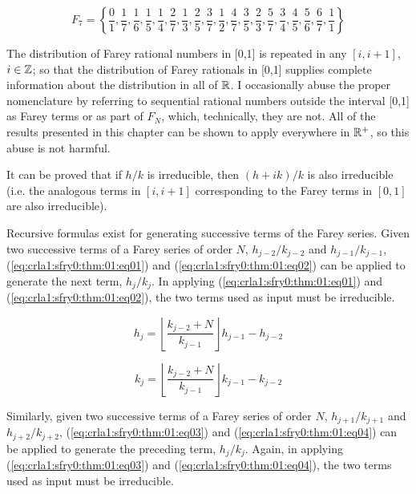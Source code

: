 \begin{equation}
\label{eq:crla1:sfry0:eq0001g}
F_7  = \left\{ {\frac{0}{1},\frac{1}{7},\frac{1}{6},\frac{1}{5},
                \frac{1}{4},\frac{2}{7},
                \frac{1}{3},\frac{2}{5},\frac{3}{7},\frac{1}{2},
                \frac{4}{7},\frac{3}{5},\frac{2}{3},
                \frac{5}{7},\frac{3}{4},
                \frac{4}{5},
                \frac{5}{6},\frac{6}{7},\frac{1}{1} } \right\}
\end{equation}

The distribution of Farey rational numbers in [0,1] is repeated in any
$[i,i+1]$, $i\in {\mathbb{Z}}$; so that the distribution of Farey
rationals in [0,1] supplies complete information about the distribution in
all of ${\mathbb{R}}$\@.  I occasionally abuse the proper nomenclature by
referring to sequential rational numbers outside the interval [0,1] as
Farey terms or as part of $F_N$, which, technically, they are not.  All of
the results presented in this chapter can be shown to apply everywhere in
${\mathbb{R}^+}$, so this abuse is not harmful.

It can be proved that if $h/k$ is irreducible, then $(h+ik)/k$ is also
irreducible (i.e.  the analogous terms in $[i, i+1]$ corresponding to the
Farey terms in $[0,1]$ are also irreducible).

Recursive formulas exist for generating successive terms of the Farey
series.  Given two successive terms of a Farey series of order $N$,
$h_{j-2}/k_{j-2}$ and $h_{j-1}/k_{j-1}$, (\ref{eq:crla1:sfry0:thm:01:eq01})
and (\ref{eq:crla1:sfry0:thm:01:eq02}) can be applied to generate the next
term, $h_{j}/k_{j}$\@.  In applying (\ref{eq:crla1:sfry0:thm:01:eq01}) and
(\ref{eq:crla1:sfry0:thm:01:eq02}), the two terms used as input must be
irreducible.

\begin{equation}
\label{eq:crla1:sfry0:thm:01:eq01}
h_{j}  = \left\lfloor {\frac{{k_{j-2}
     + N}}{{k_{j - 1} }}} \right\rfloor h_{j - 1}  - h_{j-2}
\end{equation}

\begin{equation}
\label{eq:crla1:sfry0:thm:01:eq02}
k_{j}  = \left\lfloor {\frac{{k_{j-2}  + N}}{{k_{j
     - 1} }}} \right\rfloor k_{j - 1}  - k_{j-2}
\end{equation}

Similarly, given two successive terms of a Farey series of order $N$,
$h_{j+1}/k_{j+1}$ and $h_{j+2}/k_{j+2}$, (\ref{eq:crla1:sfry0:thm:01:eq03})
and (\ref{eq:crla1:sfry0:thm:01:eq04}) can be applied to generate the
preceding term, $h_{j}/k_{j}$\@.  Again, in applying
(\ref{eq:crla1:sfry0:thm:01:eq03}) and (\ref{eq:crla1:sfry0:thm:01:eq04}),
the two terms used as input must be irreducible.

